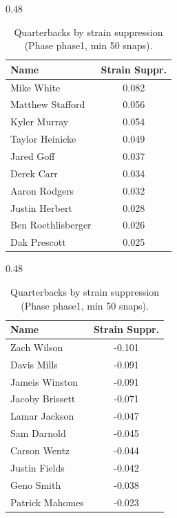 \begin{table}[h!]
\centering
\begin{subtable}{0.48\textwidth}
\centering
\footnotesize
\begin{tabular}{lc}
\toprule
Name & Strain Suppr. \\
\midrule
Mike White & 0.082 \\
Matthew Stafford & 0.056 \\
Kyler Murray & 0.054 \\
Taylor Heinicke & 0.049 \\
Jared Goff & 0.037 \\
Derek Carr & 0.034 \\
Aaron Rodgers & 0.032 \\
Justin Herbert & 0.028 \\
Ben Roethlisberger & 0.026 \\
Dak Prescott & 0.025 \\
\bottomrule
\end{tabular}
\caption{Most strain-suppressing}
\end{subtable}
\hfill
\begin{subtable}{0.48\textwidth}
\centering
\footnotesize
\begin{tabular}{lc}
\toprule
Name & Strain Suppr. \\
\midrule
Zach Wilson & -0.101 \\
Davis Mills & -0.091 \\
Jameis Winston & -0.091 \\
Jacoby Brissett & -0.071 \\
Lamar Jackson & -0.047 \\
Sam Darnold & -0.045 \\
Carson Wentz & -0.044 \\
Justin Fields & -0.042 \\
Geno Smith & -0.038 \\
Patrick Mahomes & -0.023 \\
\bottomrule
\end{tabular}
\caption{Least strain-suppressing}
\end{subtable}
\hfill
\caption{Quarterbacks by strain suppression (Phase phase1, min 50 snaps).}
\label{tab:qb_supp_phase1}
\end{table}
